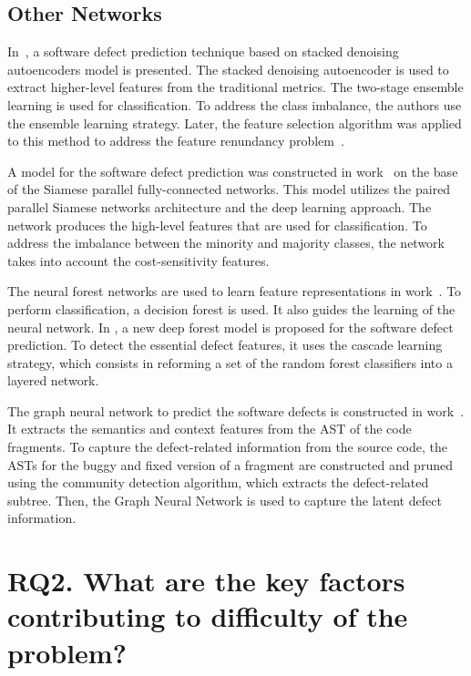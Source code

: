 \documentclass[mathematics,review,submit,moreauthors,pdftex]{Definitions/mdpi}
\begin{document}
\subsection{Other Networks}

In~\cite{TongLiuWang2018}, a software defect prediction technique based on stacked denoising autoencoders model is presented. The stacked denoising autoencoder is used to extract higher-level features from the traditional metrics. The two-stage ensemble learning is used for classification. To address the class imbalance, the authors use the ensemble learning strategy. Later, the feature selection algorithm was applied to this method to address the feature renundancy problem~\cite{TranHanhBinh2019}.

A model for the software defect prediction was constructed in work~\cite{ZhaoEtAl2019} on the base of the Siamese parallel fully-connected networks. This model utilizes the paired parallel Siamese networks architecture and the deep learning approach. The network produces the high-level features that are used for classification. To address the imbalance between the minority and majority classes, the network takes into account the cost-sensitivity features.

The neural forest networks are used to learn feature representations in work~\cite{QiuEtAl2019}. To perform classification, a decision forest is used. It also guides the learning of the neural network. 
In \cite{ZhouEtAl2019}, a new deep forest model is proposed for the software defect prediction. 
To detect the essential defect features, it uses the cascade learning strategy, which consists in reforming a set of the random forest classifiers into a layered network.

The graph neural network to predict the software defects is constructed in work~\cite{XuWangAi2020}. It extracts the semantics and context features from the AST of the code fragments. To capture the defect-related information from the source code, the ASTs for the buggy and fixed version of a fragment are constructed and pruned using the community detection algorithm, which extracts the defect-related subtree.
Then, the Graph Neural Network is used to capture the latent defect information.


\section{RQ2. What are the key factors contributing to difficulty of the problem?} \label{sec_4}
\end{document}
